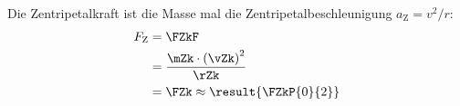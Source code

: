 Die Zentripetalkraft ist die Masse mal die Zentripetalbeschleunigung $a_\mathrm{Z} = v^2/r$:
\begin{align}
 F_\mathrm{Z} &= \FZkF \\
   &= \frac{\mZk\cdot\left(\vZk\right)^2}{\rZk} \\
   &= \FZk \approx \result{\FZkP{0}{2}}
\end{align}
